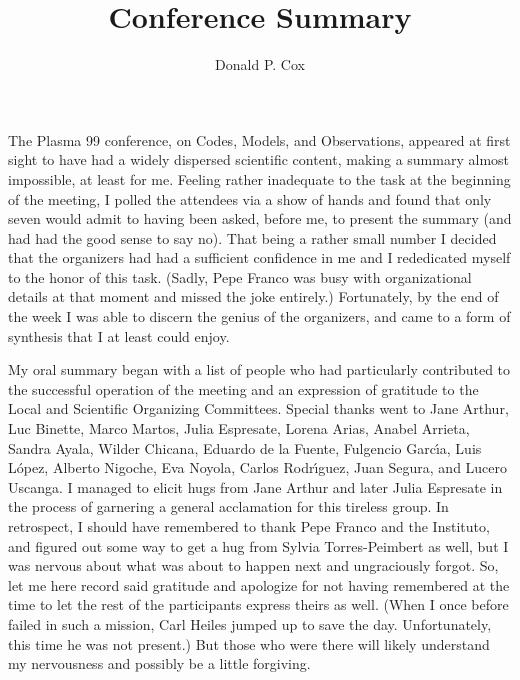 \documentclass[proceedings]{rmaa}
\title{Conference Summary}
\author{Donald P. Cox
  \affil{Department of Physics, University of Wisconsin-Madison, USA} }
\begin{document}
\maketitle



\noindent The Plasma 99 conference, on Codes, Models, and Observations, appeared at 
first sight to have had a widely dispersed scientific content, making a 
summary almost impossible, at least for me.  Feeling rather inadequate to 
the task at the beginning of the meeting, I polled the attendees via a 
show of hands and found that only seven would admit to having been asked, 
before me, to present the summary (and had had the good sense to say 
no).  That being a rather small number I decided that the organizers had  
had a sufficient confidence in me and I rededicated myself to the honor 
of this task.  (Sadly, Pepe Franco was busy with organizational details 
at that moment and missed the joke entirely.)  Fortunately, by the end of 
the week I was able to discern the genius of the organizers, and came to  
a form of synthesis that I at least could enjoy.

My oral summary began with a list of people who had particularly
contributed to the successful operation of the meeting and an
expression of gratitude to the Local and Scientific Organizing
Committees.  Special thanks went to Jane Arthur, Luc Binette, Marco
Martos, Julia Espresate, Lorena Arias, Anabel Arrieta, Sandra Ayala,
Wilder Chicana, Eduardo de la Fuente, Fulgencio Garc\'{\i}a, Luis
L\'opez, Alberto Nigoche, Eva Noyola, Carlos Rodr\'{\i}guez, Juan
Segura, and Lucero Uscanga.  I managed to elicit hugs from Jane Arthur
and later Julia Espresate in the process of garnering a general
acclamation for this tireless group.  In retrospect, I should have
remembered to thank Pepe Franco and the Instituto, and figured out
some way to get a hug from Sylvia Torres-Peimbert as well, but I was
nervous about what was about to happen next and ungraciously forgot.
So, let me here record said gratitude and apologize for not having
remembered at the time to let the rest of the participants express
theirs as well.  (When I once before failed in such a mission, Carl
Heiles jumped up to save the day.  Unfortunately, this time he was not
present.)  But those who were there will likely understand my
nervousness and possibly be a little forgiving.
\end{document}
